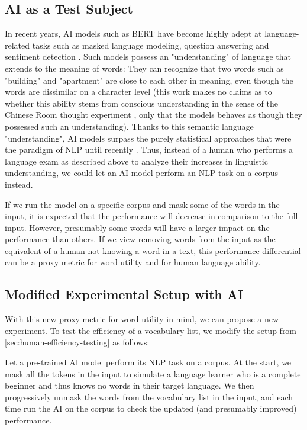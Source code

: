 \subsection{AI as a Test Subject} \label{sec:ai-as-test-subject}
In recent years, AI models such as BERT have become highly adept at language-related tasks such as masked language modeling, question answering  and sentiment detection \cite{kentonBertPretrainingDeep2019}.
Such models possess an "understanding" of language that extends to the meaning of words:
They can recognize that two words such as "building" and "apartment" are close to each other in meaning, even though the words are dissimilar on a character level (this work makes no claims as to whether this ability stems from conscious understanding in the sense of the Chinese Room thought experiment \cite{searleMindsBrainsPrograms1980}, only that the models behaves as though they possessed such an understanding).
Thanks to this semantic language "understanding", AI models surpass the purely statistical approaches that were the paradigm of NLP until recently \cite{jurafskySpeechLanguageProcessing2025a}.
Thus, instead of a human who performs a language exam as described above to analyze their increases in linguistic understanding, we could let an AI model perform an NLP task on a corpus instead.

If we run the model on a specific corpus and mask some of the words in the input, it is expected that the performance will decrease in comparison to the full input.
However, presumably some words will have a larger impact on the performance than others.
If we view removing words from the input as the equivalent of a human not knowing a word in a text, this performance differential can be a proxy metric for word utility and for human language ability.

\subsection{Modified Experimental Setup with AI} \label{sec:ai-experiment-setup}
With this new proxy metric for word utility in mind, we can propose a new experiment.
To test the efficiency of a vocabulary list, we modify the setup from \ref{sec:human-efficiency-testing} as follows:

Let a pre-trained AI model perform its NLP task on a corpus.
At the start, we mask all the tokens in the input to simulate a language learner who is a complete beginner and thus knows no words in their target language.
We then progressively unmask the words from the vocabulary list in the input, and each time run the AI on the corpus to check the updated (and presumably improved) performance.

